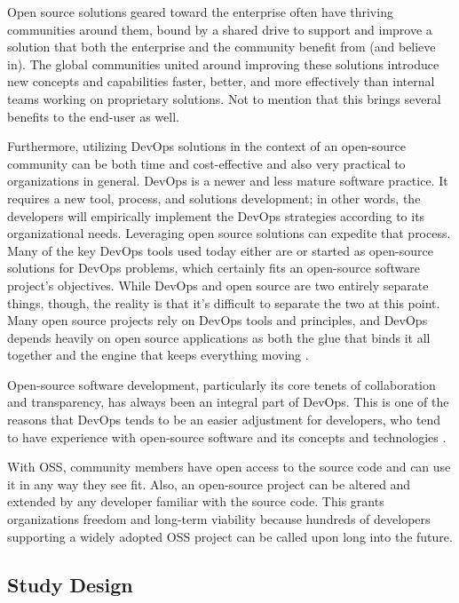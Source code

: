 Open source solutions geared toward the enterprise often have thriving
communities around them, bound by a shared drive to support and improve a
solution that both the enterprise and the community benefit from (and believe
in). The global communities united around improving these solutions introduce
new concepts and capabilities faster, better, and more effectively than internal
teams working on proprietary solutions. Not to mention that this brings several
benefits to the end-user as well.
 
Furthermore, utilizing DevOps solutions in the context of an open-source
community can be both time and cost-effective and also very practical to
organizations in general. DevOps is a newer and less mature software practice.
It requires a new tool, process, and solutions development; in other words, the
developers will empirically implement the DevOps strategies according to its
organizational needs. Leveraging open source solutions can expedite that
process. Many of the key DevOps tools used today either are or started as
open-source solutions for DevOps problems, which certainly fits an open-source
software project's objectives. While DevOps and open source are two entirely
separate things, though, the reality is that it’s difficult to separate the two
at this point. Many open source projects rely on DevOps tools and principles,
and DevOps depends heavily on open source applications as both the glue that
binds it all together and the engine that keeps everything moving
\cite{techspective2016}.

Open-source software development, particularly its core tenets of collaboration
and transparency, has always been an integral part of DevOps. This is one of the
reasons that DevOps tends to be an easier adjustment for developers, who tend to
have experience with open-source software and its concepts and technologies
\cite{techbeacon2020}.

With OSS, community members have open access to the source code and can use it
in any way they see fit. Also, an open-source project can be altered and
extended by any developer familiar with the source code. This grants
organizations freedom and long-term viability because hundreds of developers
supporting a widely adopted OSS project can be called upon long into the future.

\subsection{Study Design}

